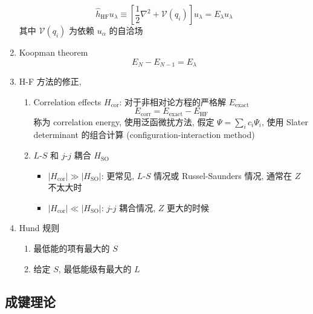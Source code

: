 \documentclass[10pt,a4paper,twocolumn]{article} %
\numberwithin{equation}{section} %
\begin{document}
\begin{enumerate}
\begin{equation}
		\hat h_{\mathrm{HF}} u_\lambda \equiv
		\left[\frac 12 \nabla^2 + \mathscr V(q_i)\right] u_\lambda 
		= E_\lambda u_\lambda
	\end{equation}
	其中 $\mathscr V(q_i)$ 为依赖 $u_\alpha$ 的自洽场
	\item Koopman theorem
	\begin{equation}
		E_N - E_{N-1} = E_\lambda
	\end{equation}
	\item H-F 方法的修正, 
	\begin{enumerate}
		\item Correlation effects $H_{\mathrm{cor}}$: 
		对于非相对论方程的严格解 $E_{\mathrm{exact}}$
		\begin{equation}
			E_{\mathrm{corr}} = E_{\mathrm{exact}} - E_{\mathrm{HF}}
		\end{equation}
		称为 correlation energy, 使用泛函微扰方法, 假定 $\Psi = \sum_i c_i\Psi_i$, 
		使用 Slater determinant 的组合计算 (configuration-interaction method)
		\item $L$-$S$ 和 $j$-$j$ 耦合 $H_{\mathrm{SO}}$
		\begin{itemize}
			\item $|H_{\mathrm{cor}}| \gg |H_{\mathrm{SO}}|$: 
			更常见, $L$-$S$ 情况或 Russel-Saunders 情况, 通常在 $Z$ 不太大时
			\item $|H_{\mathrm{cor}}| \ll |H_{\mathrm{SO}}|$: 
			$j$-$j$ 耦合情况, $Z$ 更大的时候
		\end{itemize}
	\end{enumerate}
	\item Hund 规则
	\begin{enumerate}
		\item 最低能的项有最大的 $S$
		\item 给定 $S$, 最低能级有最大的 $L$
	\end{enumerate}
\end{enumerate}
\subsection{成键理论} %
\label{sub:bound}
\end{document}
